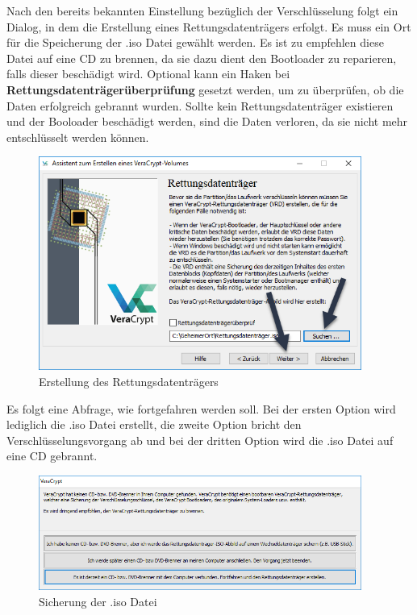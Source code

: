 \documentclass[12pt,a4paper]{scrreprt}
\begin{document}
\noindent Nach den bereits bekannten Einstellung bezüglich der Verschlüsselung folgt ein Dialog, in dem die Erstellung eines Rettungsdatenträgers erfolgt. Es muss ein Ort für die Speicherung der .iso Datei gewählt werden. Es ist zu empfehlen diese Datei auf eine CD zu brennen, da sie dazu dient den Bootloader zu reparieren, falls dieser beschädigt wird. Optional kann ein Haken bei \textbf{Rettungsdatenträgerüberprüfung} gesetzt werden, um zu überprüfen, ob die Daten erfolgreich gebrannt wurden. Sollte kein Rettungsdatenträger existieren und der Booloader beschädigt werden, sind die Daten verloren, da sie nicht mehr entschlüsselt werden können.

\begin{figure}[h]
\begin{center}
\includegraphics[width=300pt]{media/rescue1.png}
\caption{Erstellung des Rettungsdatenträgers}
\label{rescue1}
\end{center}
\end{figure}

\newpage

\noindent Es folgt eine Abfrage, wie fortgefahren werden soll. Bei der ersten Option wird lediglich die .iso Datei erstellt, die zweite Option bricht den Verschlüsselungsvorgang ab und bei der dritten Option wird die .iso Datei auf eine CD gebrannt.

\begin{figure}[h]
\begin{center}
\includegraphics[width=300pt]{media/rescue2.png}
\caption{Sicherung der .iso Datei}
\label{rescue2}
\end{center}
\end{figure}
\end{document}
